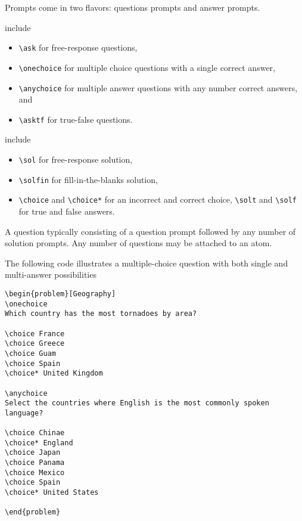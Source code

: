 \begin{gram}[Prompts]
Prompts come in two flavors: questions prompts and answer prompts.
%

  include 
%
\begin{itemize}
\item \lstinline`\ask` for free-response questions, 
%
\item \lstinline`\onechoice` for multiple choice questions with a single correct answer, 
%
\item \lstinline`\anychoice` for multiple answer questions with any number correct answers, and 
%
\item \lstinline`\asktf` for true-false questions.
\end{itemize}

  include 
%
\begin{itemize}

\item \lstinline`\sol` for free-response solution, 
%
\item \lstinline`\solfin` for fill-in-the-blanks solution, 
%
\item \lstinline`\choice` and \lstinline`\choice*` for an incorrect and correct choice, 
%
\lstinline`\solt` and \lstinline`\solf`   for true and false answers.
\end{itemize}

A question typically consisting of a question prompt followed by any
number of solution prompts.  
%
Any number of questions may be attached  to an atom.
\end{gram}

\begin{example}

The following code illustrates a multiple-choice question with both
single and multi-answer possibilities

\begin{lstlisting}
\begin{problem}[Geography]
\onechoice
Which country has the most tornadoes by area?

\choice France
\choice Greece
\choice Guam
\choice Spain
\choice* United Kingdom

\anychoice 
Select the countries where English is the most commonly spoken language?

\choice Chinae
\choice* England
\choice Japan
\choice Panama
\choice Mexico
\choice Spain
\choice* United States

\end{problem}

\end{lstlisting}
\end{example}

